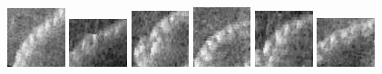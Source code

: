 \begin{figure}
    \includegraphics[width=0.15\textwidth]{chapters/images/dataset/all-class-images/chain/chain-63.jpg}
    \includegraphics[width=0.15\textwidth]{chapters/images/dataset/all-class-images/chain/chain-111.jpg}        
    \includegraphics[width=0.15\textwidth]{chapters/images/dataset/all-class-images/chain/chain-133.jpg}
    \includegraphics[width=0.15\textwidth]{chapters/images/dataset/all-class-images/chain/chain-78.jpg}
    \includegraphics[width=0.15\textwidth]{chapters/images/dataset/all-class-images/chain/chain-160.jpg}
    \includegraphics[width=0.15\textwidth]{chapters/images/dataset/all-class-images/chain/chain-224.jpg}
    

\end{figure}

